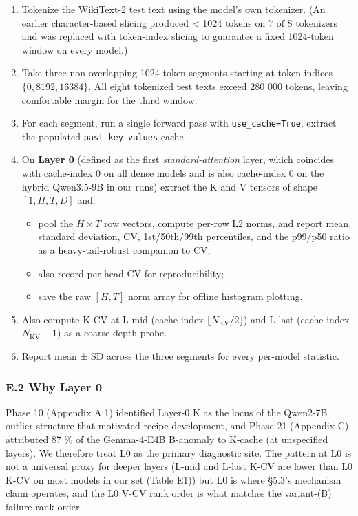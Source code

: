 \begin{enumerate}
\def\labelenumi{\arabic{enumi}.}
\tightlist
\item
  Tokenize the WikiText-2 test text using the model's own tokenizer. (An
  earlier character-based slicing produced \textless{} 1024 tokens on 7
  of 8 tokenizers and was replaced with token-index slicing to guarantee
  a fixed 1024-token window on every model.)
\item
  Take three non-overlapping 1024-token segments starting at token
  indices \(\{0, 8192, 16384\}\). All eight tokenized test texts exceed
  280 000 tokens, leaving comfortable margin for the third window.
\item
  For each segment, run a single forward pass with
  \texttt{use\_cache=True}, extract the populated
  \texttt{past\_key\_values} cache.
\item
  On \textbf{Layer 0} (defined as the first \emph{standard-attention}
  layer, which coincides with cache-index 0 on all dense models and is
  also cache-index 0 on the hybrid Qwen3.5-9B in our runs) extract the K
  and V tensors of shape \([1, H, T, D]\) and:

  \begin{itemize}
  \tightlist
  \item
    pool the \(H \times T\) row vectors, compute per-row L2 norms, and
    report mean, standard deviation, CV, 1st/50th/99th percentiles, and
    the p99/p50 ratio as a heavy-tail-robust companion to CV;
  \item
    also record per-head CV for reproducibility;
  \item
    save the raw \([H, T]\) norm array for offline histogram plotting.
  \end{itemize}
\item
  Also compute K-CV at L-mid (cache-index
  \(\lfloor N_{\mathrm{KV}} / 2 \rfloor\)) and L-last (cache-index
  \(N_{\mathrm{KV}} - 1\)) as a coarse depth probe.
\item
  Report mean ± SD across the three segments for every per-model
  statistic.
\end{enumerate}

\subsubsection{E.2 Why Layer 0}\label{e.2-why-layer-0}

Phase 10 (Appendix A.1) identified Layer-0 K as the locus of the
Qwen2-7B outlier structure that motivated recipe development, and Phase
21 (Appendix C) attributed 87 \% of the Gemma-4-E4B B-anomaly to K-cache
(at unspecified layers). We therefore treat L0 as the primary diagnostic
site. The pattern at L0 is not a universal proxy for deeper layers
(L-mid and L-last K-CV are lower than L0 K-CV on most models in our set
(Table E1)) but L0 is where §5.3's mechanism claim operates, and the L0
V-CV rank order is what matches the variant-(B) failure rank order.


